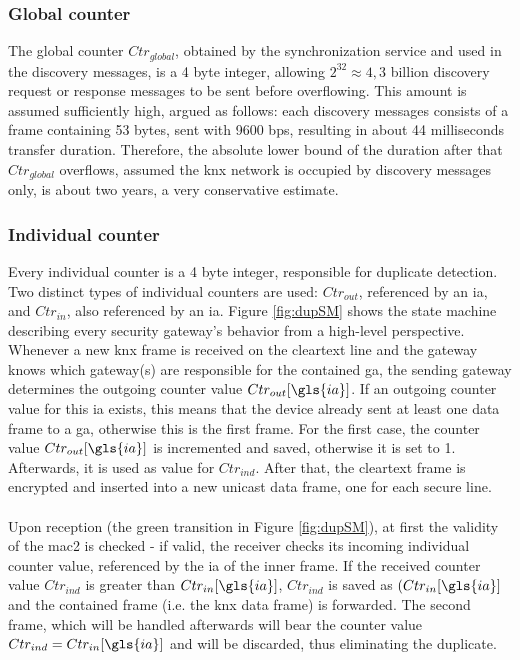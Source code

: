 \subsubsection{Global counter}\label{ctrGlobal}
The global counter $Ctr_{global}$, obtained by the synchronization service and used in the discovery messages,
is a 4 byte integer, allowing $2^{32} \approx 4,3$ billion discovery request or response messages to be sent before overflowing.
This amount is assumed sufficiently high, argued as follows:
each discovery messages consists of a frame containing 53 bytes, sent with 9600 \gls{bps}, resulting in about 44 milliseconds transfer duration. Therefore,
the absolute lower bound of the duration after that $Ctr_{global}$ overflows, assumed the \gls{knx} network is occupied by discovery messages only,
is about two years, a very conservative estimate.

\subsubsection{Individual counter}\label{ctrInd}

Every individual counter is a 4 byte integer, responsible for duplicate detection. Two distinct types of individual counters are used: $Ctr_{out}$, referenced
by an \gls{ia}, and $Ctr_{in}$, also referenced by an \gls{ia}.
Figure \ref{fig:dupSM} shows the state machine describing every security gateway's behavior from a high-level perspective.
\\
Whenever a new \gls{knx} frame is received on the cleartext line and the gateway knows which gateway(s) are responsible for the
contained \gls{ga}, the sending gateway determines the outgoing counter value $Ctr_{out}[\gls{ia}]$. If an outgoing counter value for
this \gls{ia} exists, this means that the device already sent at least one data frame to a \gls{ga}, otherwise this is the first frame. For the first case,
the counter value $Ctr_{out}[\gls{ia}]$ is incremented and saved, otherwise it is set to 1. Afterwards, it is used as value for $Ctr_{ind}$.
After that, the cleartext frame is encrypted and inserted into a new unicast data frame, one for each secure line.
\\
\\
Upon reception (the green transition in Figure \ref{fig:dupSM}), at first the validity of the \gls{mac2} is checked - if valid, the receiver checks its incoming
individual counter value, referenced by the \gls{ia} of the inner frame. If the received counter value $Ctr_{ind}$ is greater than $Ctr_{in}[\gls{ia}]$,
 $Ctr_{ind}$ is saved as $(Ctr_{in}[\gls{ia}]$ and the contained frame (i.e. the \gls{knx} data frame) is forwarded. The second frame, which will be handled 
afterwards will bear the counter value $Ctr_{ind} = Ctr_{in}[\gls{ia}]$ and will be discarded, thus eliminating the duplicate.

